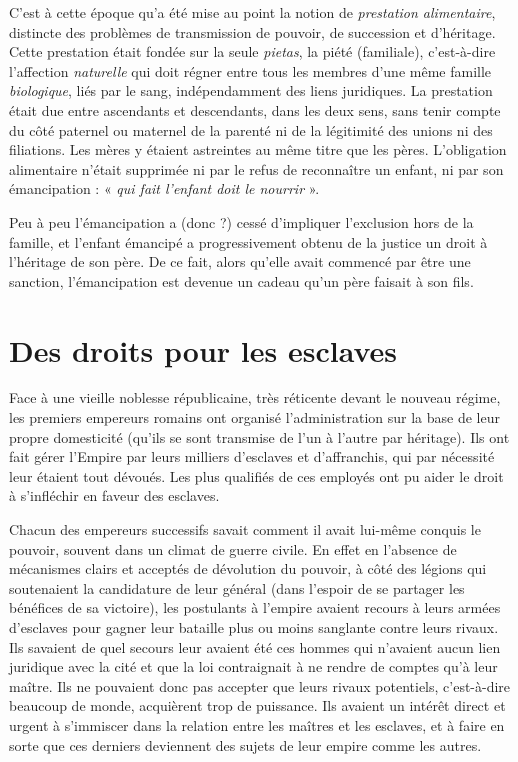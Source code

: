  C'est à cette époque qu'a été mise au point la notion de \emph{prestation alimentaire}, distincte des problèmes de transmission de pouvoir, de succession et d'héritage. Cette prestation était fondée sur la seule \emph{pietas}, la piété (familiale), c'est-à-dire l'affection \emph{naturelle} qui doit régner entre tous les membres d'une même famille \emph{biologique}, liés par le sang, indépendamment des liens juridiques. La prestation était due entre ascendants et descendants, dans les deux sens, sans tenir compte du côté paternel ou maternel de la parenté ni de la légitimité des unions ni des filiations. Les mères y étaient astreintes au même titre que les pères. L'obligation alimentaire n'était supprimée ni par le refus de reconnaître un enfant, ni par son émancipation : « \emph{qui fait l'enfant doit le nourrir} ». 

 Peu à peu l'émancipation a (donc ?) cessé d'impliquer l'exclusion hors de la famille, et l'enfant émancipé a progressivement obtenu de la justice un droit à l'héritage de son père. De ce fait, alors qu'elle avait commencé par être une sanction, l'émancipation est devenue un cadeau qu'un père faisait à son fils.


\section{Des droits pour les esclaves}

 Face à une vieille noblesse républicaine, très réticente devant le nouveau régime, les premiers empereurs romains ont organisé l'administration sur la base de leur propre domesticité (qu'ils se sont transmise de l'un à l'autre par héritage). Ils ont fait gérer l'Empire par leurs milliers d'esclaves et d'affranchis, qui par nécessité leur étaient tout dévoués. Les plus qualifiés de ces employés ont pu aider le droit à s'infléchir en faveur des esclaves. 

 Chacun des empereurs successifs savait comment il avait lui-même conquis le pouvoir, souvent dans un climat de guerre civile. En effet en l'absence de mécanismes clairs et acceptés de dévolution du pouvoir, à côté des légions qui soutenaient la candidature de leur général (dans l'espoir de se partager les bénéfices de sa victoire), les postulants à l'empire avaient recours à leurs armées d'esclaves pour gagner leur bataille plus ou moins sanglante contre leurs rivaux. Ils savaient de quel secours leur avaient été ces hommes qui n'avaient aucun lien juridique avec la cité et que la loi contraignait à ne rendre de comptes qu'à leur maître. Ils ne pouvaient donc pas accepter que leurs rivaux potentiels, c'est-à-dire beaucoup de monde, acquièrent trop de puissance. Ils avaient un intérêt direct et urgent à s'immiscer dans la relation entre les maîtres et les esclaves, et à faire en sorte que ces derniers deviennent des sujets de leur empire comme les autres. 

